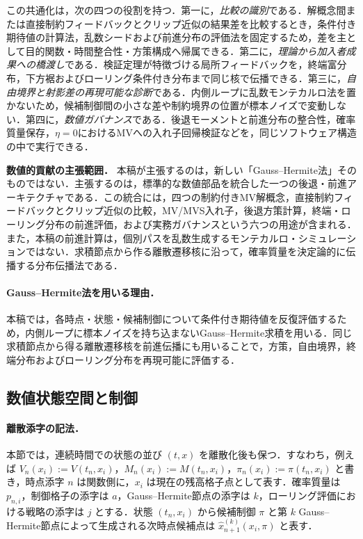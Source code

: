 \documentclass[10pt,a4paper]{article}
\theoremstyle{plain}
\theoremstyle{definition}
\begin{document}
この共通化は，次の四つの役割を持つ．第一に，\emph{比較の識別}である．解概念間または直接制約フィードバックとクリップ近似の結果差を比較するとき，条件付き期待値の計算法，乱数シードおよび前進分布の評価法を固定するため，差を主として目的関数・時間整合性・方策構成へ帰属できる．第二に，\emph{理論から加入者成果への橋渡し}である．検証定理が特徴づける局所フィードバックを，終端富分布，下方裾およびローリング条件付き分布まで同じ核で伝播できる．第三に，\emph{自由境界と射影差の再現可能な診断}である．内側ループに乱数モンテカルロ法を置かないため，候補制御間の小さな差や制約境界の位置が標本ノイズで変動しない．第四に，\emph{数値ガバナンス}である．後退モーメントと前進分布の整合性，確率質量保存，$\eta=0$におけるMVへの入れ子回帰検証などを，同じソフトウェア構造の中で実行できる．

\noindent\textbf{数値的貢献の主張範囲．}
本稿が主張するのは，新しい「Gauss--Hermite法」そのものではない．主張するのは，標準的な数値部品を統合した一つの後退・前進アーキテクチャである．この統合には，四つの制約付きMV解概念，直接制約フィードバックとクリップ近似の比較，MV/MVS入れ子，後退方策計算，終端・ローリング分布の前進評価，および実務ガバナンスという六つの用途が含まれる．また，本稿の前進計算は，個別パスを乱数生成するモンテカルロ・シミュレーションではない．求積節点から作る離散遷移核に沿って，確率質量を決定論的に伝播する分布伝播法である．

\paragraph{Gauss--Hermite法を用いる理由．}
本稿では，各時点・状態・候補制御について条件付き期待値を反復評価するため，内側ループに標本ノイズを持ち込まないGauss--Hermite求積を用いる．同じ求積節点から得る離散遷移核を前進伝播にも用いることで，方策，自由境界，終端分布およびローリング分布を再現可能に評価する．

\subsection{数値状態空間と制御}
\label{sec:grid}

\paragraph{離散添字の記法．}
本節では，連続時間での状態の並び $(t,x)$ を離散化後も保つ．すなわち，例えば $V_n(x_i):=V(t_n,x_i)$，$M_n(x_i):=M(t_n,x_i)$，$\pi_n(x_i):=\pi(t_n,x_i)$ と書き，時点添字 $n$ は関数側に，$x_i$ は現在の残高格子点として表す．確率質量は $p_{n,i}$，制御格子の添字は $a$，Gauss--Hermite節点の添字は $k$，ローリング評価における戦略の添字は $j$ とする．状態 $(t_n,x_i)$ から候補制御 $\pi$ と第 $k$ Gauss--Hermite節点によって生成される次時点候補点は $\widehat{x}_{n+1}^{(k)}(x_i,\pi)$ と表す．
\end{document}
